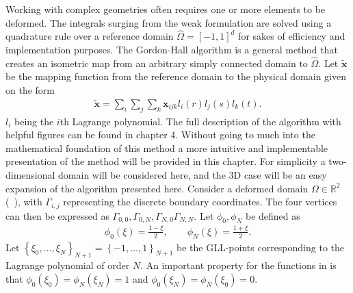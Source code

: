 Working with complex geometries often requires one or more elements to be deformed.
The integrals surging from the weak formulation are solved using a quadrature rule over 
a reference domain $\hat{\Omega} = [-1,1]^d$ for sakes of efficiency and implementation purposes. The Gordon-Hall 
algorithm is a general method that creates an isometric map from an arbitrary simply connected domain to $\hat{\Omega}$.
Let $\mathbf{\tilde{x}}$ be the mapping function from the reference domain to the physical domain given on the form 
%
\begin{align}
    \mathbf{\tilde{x}}= \sum_i \sum_j \sum_k \mathbf{x}_{ijk}l_i(r) l_j(s) l_k(t).
    \label{eq:mapping}
\end{align}
%
$l_i$ being the $i$th Lagrange polynomial.
The full description of the algorithm with helpful figures can be found in \cite{Deville} chapter 4.
Without going to much into the mathematical foundation of this method a more intuitive and implementable
presentation of the method will be provided in this chapter. 
For simplicity a two-dimensional domain will be considered here, and the 3D case will be an easy expansion 
of the algorithm presented here. Consider a deformed domain $\Omega \in \mathbb{R}^2$ (~), with $\Gamma_{i,j}$ representing 
the discrete boundary coordinates. The four vertices can then be expressed as 
$\Gamma_{0,0},\Gamma_{0,N},\Gamma_{N,0}\Gamma_{N,N}$. Let $\phi_0,\phi_N$ be defined as 
%
\begin{align}
    \phi_0(\xi) = \frac{1-\xi}{2}, \qquad
    \phi_N(\xi) = \frac{1+\xi}{2}.
    \label{eq:interpolationoperator}
\end{align}
%
Let $\left\{ \xi_0, \ldots ,\xi_N \right\}_{N+1} = \left\{ -1 ,\ldots ,1 \right\}_{N+1}$
be the GLL-points corresponding to the Lagrange polynomial of order $N$. 
An important property for the functions in  is that
$\phi_0(\xi_0) =\phi_N(\xi_N) = 1$ and $\phi_0(\xi_N) =\phi_N(\xi_0) = 0$.

